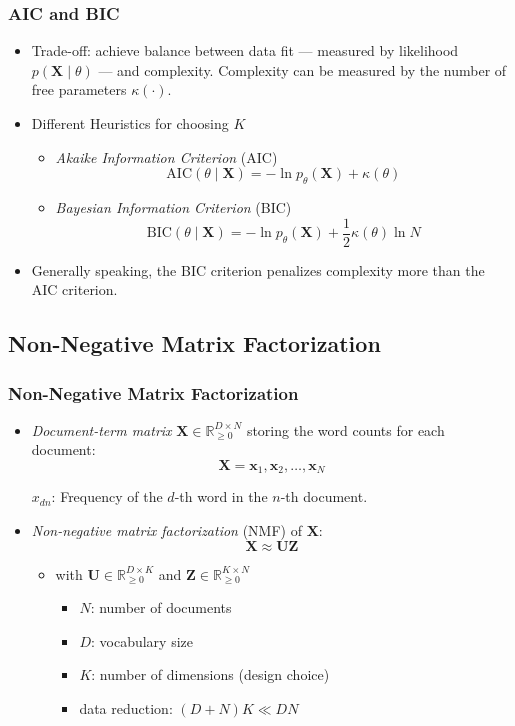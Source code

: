 \documentclass[conference,11pt]{IEEEtran}
\newcommand{\matr}[1]{\boldsymbol{\mathbf{#1}}}
\newcommand{\vect}[1]{\boldsymbol{\mathbf{#1}}}
\newcommand{\R}{\mathbb{R}}
\begin{document}
\subsubsection{AIC and BIC}
\begin{itemize}
  \item Trade-off: achieve balance between data fit --- measured by likelihood
    $p(\matr{X}\mid\theta)$ --- and complexity. Complexity can be measured by
    the number of free parameters $\kappa(\cdot)$.
  \item Different Heuristics for choosing $K$
    \begin{itemize}
      \item \emph{Akaike Information Criterion} (AIC)
        \[
          \mathrm{AIC}(\theta\mid\matr{X}) = -\ln p_{\theta}(\matr{X}) +
          \kappa(\theta)
        \]
      \item \emph{Bayesian Information Criterion} (BIC)
        \[
          \mathrm{BIC}(\theta\mid\matr{X}) = -\ln p_{\theta}(\matr{X}) +
          \frac{1}{2} \kappa(\theta) \ln N
        \]
    \end{itemize}
  \item Generally speaking, the BIC criterion penalizes complexity more than
    the AIC criterion.
\end{itemize}

\subsection{Non-Negative Matrix Factorization}
\subsubsection{Non-Negative Matrix Factorization}
\begin{itemize}
  \item \emph{Document-term matrix} $\matr{X} \in \R_{\geq 0}^{D \times N}$
    storing the word counts for each document:
    \[ \matr{X} = \vect{x}_1, \vect{x}_2, \ldots, \vect{x}_N \]

    $x_{dn}$: Frequency of the $d$-th word in the $n$-th document.

  \item \emph{Non-negative matrix factorization} (NMF) of $\matr{X}$:
    \[ \matr{X} \approx \matr{U}\matr{Z} \]
    \begin{itemize}
      \item with $\matr{U} \in \R_{\geq 0}^{D \times K}$ and $\matr{Z} \in
        \R_{\geq 0}^{K \times N}$
        \begin{itemize}
          \item $N$: number of documents
          \item $D$: vocabulary size
          \item $K$: number of dimensions (design choice)
          \item data reduction: $(D+N)K \ll DN$
        \end{itemize}
    \end{itemize}
\end{itemize}
\end{document}
